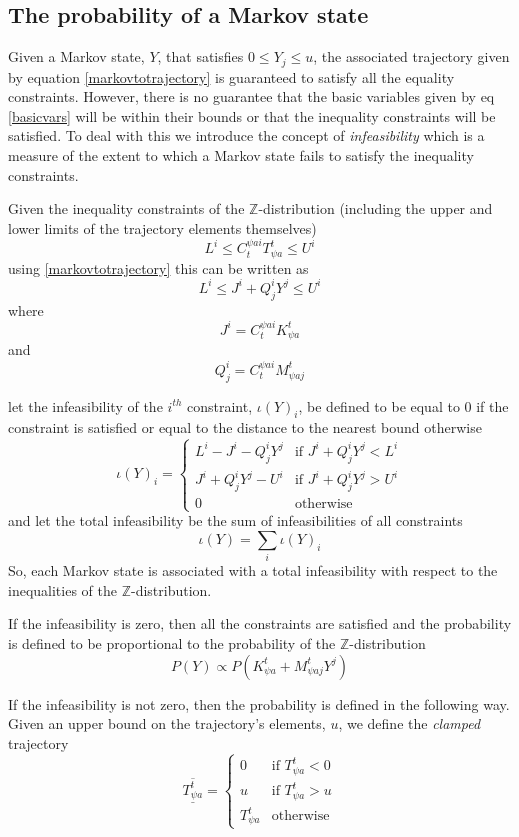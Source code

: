 \documentclass{article}
\begin{document}
\subsection{The probability of a Markov state}

Given a Markov state, $Y$, that satisfies $0 \le Y_j \le u$, the associated trajectory given by equation \eqref{markovtotrajectory} is guaranteed to satisfy all the equality constraints. However, there is no guarantee that the basic variables given by eq \eqref{basicvars} will be within their bounds or that the inequality constraints will be satisfied. To deal with this we introduce the concept of \textit{infeasibility} which is a measure of the extent to which a Markov state fails to satisfy the inequality constraints.

Given the inequality constraints of the $\mathbb{Z}$-distribution (including the upper and lower limits of the trajectory elements themselves)
\[
L^i \le C^{\psi ai}_{t} T^t_{\psi a} \le U^i
\]
using \eqref{markovtotrajectory} this can be written as
\begin{equation}
L^i \le J^i + Q_j^i Y^j \le U^i
\label{ineqconstraints}
\end{equation}
where
\[
J^i = C^{\psi ai}_{t} K^t_{\psi a}
\]
and
\[
Q_j^i = C^{\psi ai}_{t}M^{t}_{\psi aj}
\]

let the infeasibility of the $i^{th}$ constraint, $\iota(Y)_i$, be defined to be equal to 0 if the constraint is satisfied or equal to the distance to the nearest bound otherwise
\[
\iota(Y)_i =
\begin{cases}
L^i- J^i - Q_j^iY^j & \text{if }J^i + Q_j^iY^j<L^i\\
J^i + Q_j^iY^j-U^i & \text{if }J^i + Q_j^iY^j>U^i\\
0 & \text{otherwise}
\end{cases}
\]
and let the total infeasibility be the sum of infeasibilities of all constraints
\[
\iota(Y) = \sum_i \iota(Y)_i
\]
So, each Markov state is associated with a total infeasibility with respect to the inequalities of the $\mathbb{Z}$-distribution. 

If the infeasibility is zero, then all the constraints are satisfied and the probability is defined to be proportional to the probability of the $\mathbb{Z}$-distribution
\[
P(Y) \propto P(K^t_{\psi a} + M^{t}_{\psi aj}Y^j)
\]

If the infeasibility is not zero, then the probability is defined in the following way. Given an upper bound on the trajectory's elements, $u$, we define the \textit{clamped} trajectory
\[
\overline{\underline{T^t_{\psi a}}} = 
\begin{cases}
0 & \text{if }T^t_{\psi a}<0\\
u & \text{if }T^t_{\psi a}>u\\
T^t_{\psi a} & \text{otherwise}
\end{cases}
\]
\end{document}
